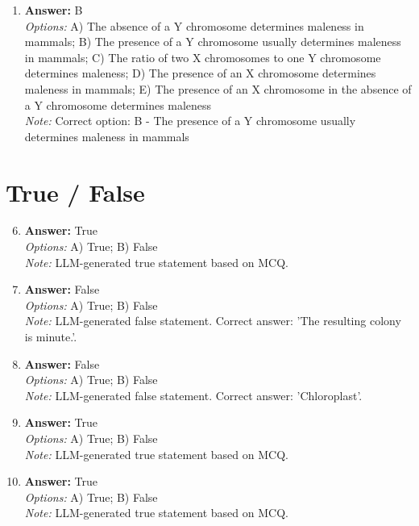 \documentclass[12pt]{article}
\begin{document}
\begin{enumerate}[label=\arabic*.]
\\ \textit{Note:} Correct option: A - The human genome has fully adapted to current environmental pressures
\item \textbf{Answer:} B
\\ \textit{Options:} A) The absence of a Y chromosome determines maleness in mammals; B) The presence of a Y chromosome usually determines maleness in mammals; C) The ratio of two X chromosomes to one Y chromosome determines maleness; D) The presence of an X chromosome determines maleness in mammals; E) The presence of an X chromosome in the absence of a Y chromosome determines maleness
\\ \textit{Note:} Correct option: B - The presence of a Y chromosome usually determines maleness in mammals
\end{enumerate}

\section*{True / False}
\begin{enumerate}[label=\arabic*.]
\setcounter{enumi}{5}
\item \textbf{Answer:} True
\\ \textit{Options:} A) True; B) False
\\ \textit{Note:} LLM-generated true statement based on MCQ.
\item \textbf{Answer:} False
\\ \textit{Options:} A) True; B) False
\\ \textit{Note:} LLM-generated false statement. Correct answer: 'The resulting colony is minute.'.
\item \textbf{Answer:} False
\\ \textit{Options:} A) True; B) False
\\ \textit{Note:} LLM-generated false statement. Correct answer: 'Chloroplast'.
\item \textbf{Answer:} True
\\ \textit{Options:} A) True; B) False
\\ \textit{Note:} LLM-generated true statement based on MCQ.
\item \textbf{Answer:} True
\\ \textit{Options:} A) True; B) False
\\ \textit{Note:} LLM-generated true statement based on MCQ.
\end{enumerate}
\end{document}
